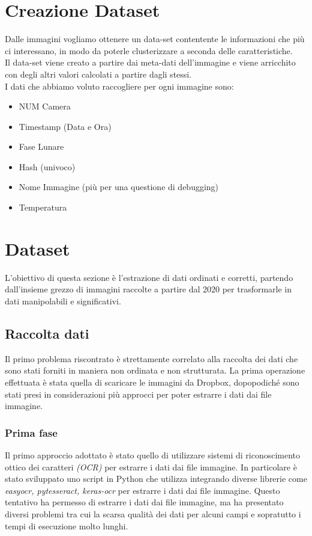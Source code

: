 \documentclass[12pt,a4paper,twoside]{article}
\begin{document}
\section{Creazione Dataset}
Dalle immagini vogliamo ottenere un data-set contentente le informazioni che più ci interessano, in modo da 
poterle clusterizzare a seconda delle caratteristiche.\\
Il data-set viene creato a partire dai meta-dati dell'immagine e viene arricchito con degli altri valori
calcolati a partire dagli stessi.\\
I dati che abbiamo voluto raccogliere per ogni immagine sono:
\begin{itemize}
    \item NUM Camera
    \item Timestamp (Data e Ora)
    \item Fase Lunare
    \item Hash (univoco)
    \item Nome Immagine (più per una questione di debugging)
    \item Temperatura
\end{itemize}

\section{Dataset}
L'obiettivo di questa sezione è l'estrazione di dati ordinati e corretti, partendo dall'insieme grezzo 
di immagini 
raccolte a partire dal 2020 per trasformarle in dati manipolabili e significativi.

\subsection{Raccolta dati}
Il primo problema riscontrato è strettamente correlato alla raccolta dei dati
che sono stati forniti in maniera non ordinata e non strutturata. La prima operazione effettuata è 
stata quella di scaricare le immagini da Dropbox, dopopodiché sono stati presi in considerazioni più 
approcci per poter estrarre i dati dai file immagine.
\subsubsection{Prima fase}
Il primo approccio adottato è stato quello di utilizzare sistemi di riconoscimento ottico dei caratteri 
\textit{(OCR)} per estrarre i dati dai file immagine. In particolare è stato sviluppato uno script in 
Python che utilizza integrando diverse librerie come \textit{easyocr, pytesseract, keras-ocr} per 
estrarre i dati dai file immagine. Questo tentativo ha permesso di estrarre i dati dai file immagine, ma 
ha presentato diversi problemi tra cui la scarsa qualità dei dati per alcuni campi e sopratutto i tempi 
di esecuzione molto lunghi. 
\end{document}
